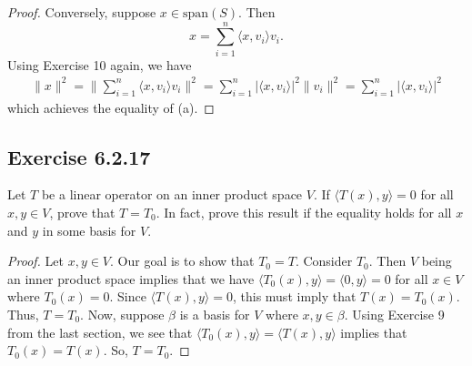 \begin{enumerate}
\begin{proof}
        Conversely, suppose \( x \in \text{span}(S) \). Then
        \[  x = \sum_{ i=1  }^{ n  } \langle x , {v}_{i} \rangle {v}_{i}.  \]
        Using Exercise 10 again, we have
        \begin{align*}
            \|x\|^{2} = \Big\| \sum_{ i=1  }^{ n  } \langle x , {v}_{i} \rangle {v}_{i} \Big\|^{2} = \sum_{ i=1  }^{ n } | \langle x , {v}_{i} \rangle |^{2} \|{v}_{i}\|^{2} = \sum_{ i=1  }^{ n  } | \langle x , {v}_{i} \rangle |^{2} 
        \end{align*}
        which achieves the equality of (a).
        \end{proof}
\end{enumerate}

\subsection*{Exercise 6.2.17}\label{Exercise 6.2.17} Let \( T  \) be a linear operator on an inner product space \( V  \). If \( \langle T(x) , y \rangle = 0  \) for all \( x,y \in V  \), prove that \( T = {T}_{0} \). In fact, prove this result if the equality holds for all \( x  \) and \( y  \) in some basis for \( V  \).
\begin{proof}
Let \( x,y \in V  \). Our goal is to show that \( {T}_{0} = T \). Consider \( {T}_{0}  \). Then \( V  \) being an inner product space implies that we have \( \langle {T}_{0}(x) , y \rangle = \langle 0 , y \rangle = 0  \) for all \( x \in V  \) where \( {T}_{0}(x) = 0  \). Since \( \langle T(x) , y \rangle = 0  \), this must imply that \( T(x) = {T}_{0}(x)   \). Thus, \( T = {T}_{0} \). Now, suppose \( \beta  \) is a basis for \( V  \) where \( x,y \in \beta \). Using Exercise 9 from the last section, we see that \( \langle {T}_{0}(x) , y \rangle = \langle T(x) , y \rangle  \) implies that \( {T}_{0}(x) = T(x) \). So, \( T = {T}_{0} \).
\end{proof}

